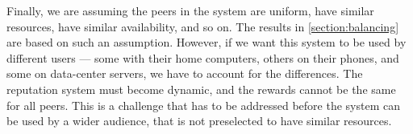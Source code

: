 Finally, we are assuming the peers in the system are uniform, have similar resources,
have similar availability, and so on.
The results in \autoref{section:balancing} are based on such an assumption.
However, if we want this system to be used by different users --- some with their home computers,
others on their phones, and some on data-center servers, we have to account for the differences.
The reputation system must become dynamic, and the rewards cannot be the same for all peers.
This is a challenge that has to be addressed before the system can be used by a wider audience,
that is not preselected to have similar resources.
